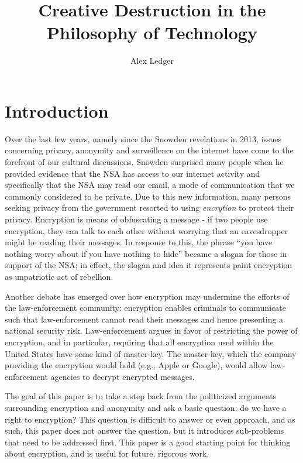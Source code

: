 \documentclass[11pt]{article}
\title{Creative Destruction in the Philosophy of Technology}
\author{Alex Ledger}
\date{}
\begin{document}
\doublespacing


\maketitle

\section{Introduction}
Over the last few years, namely since the Snowden revelations in 2013, issues concerning privacy, anonymity and surveillence on the internet have come to the forefront of our cultural discussions.
Snowden surprised many people when he provided evidence that the NSA has access to our internet activity and specifically that the NSA may read our email, a mode of communication that we commonly considered to be private.
Due to this new information, many persons seeking privacy from the government resorted to using \textit{encrytion} to protect their privacy.
Encryption is means of obfuscating a message - if two people use encryption, they can talk to each other without worrying that an eavesdropper might be reading their messages.
In response to this, the phrase ``you have nothing worry about if you have nothing to hide'' became a slogan for those in support of the NSA; in effect, the slogan and idea it represents paint encryption as unpatriotic act of rebellion.

Another debate has emerged over how encryption may undermine the efforts of the law-enforcement community: encryption enables criminals to communicate such that law-enforcement cannot read their messages and hence presenting a national security risk.
Law-enforcement argues in favor of restricting the power of encryption, and in particular, requiring that all encryption used within the United States have some kind of master-key.
The master-key, which the company providing the encrpytion would hold (e.g., Apple or Google), would allow law-enforcement agencies to decrypt encrypted messages.

The goal of this paper is to take a step back from the politicized arguments surrounding encryption and anonymity and ask a basic question: do we have a right to encryption?
This question is difficult to answer or even approach, and as such, this paper does not answer the question, but it introduces sub-problems that need to be addressed first.
This paper is a good starting point for thinking about encryption, and is useful for future, rigorous work.
\end{document}
